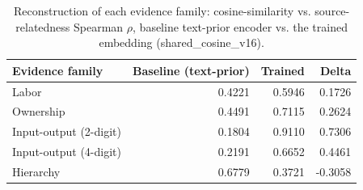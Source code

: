 \begin{table}[t]
\centering
\begin{tabular}{lrrr}
\toprule
Evidence family & Baseline (text-prior) & Trained & Delta \\
\midrule
Labor & 0.4221 & 0.5946 & 0.1726 \\
Ownership & 0.4491 & 0.7115 & 0.2624 \\
Input-output (2-digit) & 0.1804 & 0.9110 & 0.7306 \\
Input-output (4-digit) & 0.2191 & 0.6652 & 0.4461 \\
Hierarchy & 0.6779 & 0.3721 & -0.3058 \\
\bottomrule
\end{tabular}
\caption{Reconstruction of each evidence family: cosine-similarity vs. source-relatedness Spearman $\rho$, baseline text-prior encoder vs. the trained embedding (shared\_cosine\_v16).}
\label{tab:rho-table}
\end{table}
